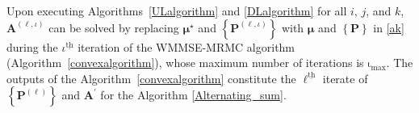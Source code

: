 \documentclass[10pt,journal]{IEEEtran}
\newcommand{\paren}[1]{\left({#1}\right)}
\newcommand{\bracket}[1]{{\left [{#1}\right ]}}
\newcommand{\braces}[1]{{\left\{ {#1}\right\}}}
\newcommand{\ith}[1]    {{#1}^{\underline{\text{th}}}}
\newcommand{\PiB}{\mathbf{P}_{\textrm{u},i}\bracket{k}}
\theoremstyle{definition}
\begin{document}
		\normalsize
		
		Upon executing Algorithms~\ref{ULalgorithm} and \ref{DLalgorithm} for all $i$, $j$, and $k$, $\mathbf{A}^{\paren{\ell,\iota}}$ can be solved by replacing  $\boldsymbol{\mu}^\star$ and $\braces{\mathbf{P}^{\paren{\ell,\iota}}}$ with $\boldsymbol{\mu}$ and $\braces{\mathbf{P}}$ in \eqref{ak} during the $\ith{\iota}$ iteration of the WMMSE-MRMC algorithm (Algorithm~\ref{convexalgorithm}), whose maximum number of iterations is $\mathrm{\iota}_{\textrm{max}}$. The outputs of the Algorithm~\ref{convexalgorithm} constitute the $\ith{\ell}$ iterate of $\braces{\mathbf{P}^{\paren{\ell}}}$ and $\mathbf{A}^\prime$ for the Algorithm \ref{Alternating_sum}.  %
\end{document}
